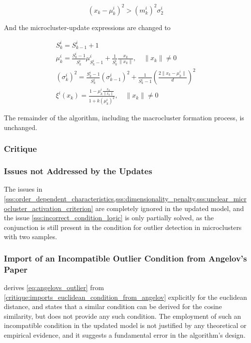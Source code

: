 \documentclass[a4paper]{article}
\begin{document}
\begin{equation}
    \left(x_k - \mu^i_k\right)^2 > \left(m^i_k\right)^2\sigma^i_2 \label{critique:imports_euclidean_condition_from_angelov}
\end{equation}

And the microcluster-update expressions are changed to

\begin{equation}
\begin{gathered}
    S^i_k = S^i_{k-1} + 1 \\
    \mu^i_k = \frac{S^i_k - 1}{S^i_k} \mu^i_{S^i_{k}-1} + \frac{1}{S^i_k} \frac{x_k}{\lVert x_k \rVert}, \quad \lVert x_k \rVert \neq 0 \\
    \left(\sigma^i_k\right)^2 = \frac{S^i_k - 1}{S^i_k} \left(\sigma^i_{k-1}\right)^2 + \frac{1}{S^i_k - 1} \left( \frac{2\lVert x_k - \mu^i_k \rVert}{d} \right)^2 \label{critique:euclidean_variance} \\
    \xi^i(x_k) = \frac{1 - \mu^i_k\frac{x_k}{\lVert x_k \rVert}}{1 + k\left(\mu^i_k\right)^2}, \quad \lVert x_k \rVert \neq 0
\end{gathered}
\end{equation}

The remainder of the algorithm, including the macrocluster formation process, is unchanged.

\subsubsection{Critique}

\subsubsection{Issues not Addressed by the Updates}

The issues in \cref{sss:order_dependent_characteristics,sss:dimensionality_penalty,sss:unclear_microcluster_activation_criterion} are completely ignored in the updated model, and the issue \ref{sss:incorrect_condition_logic} is only partially solved, as the conjunction is still present in the condition for outlier detection in microclusters with two samples.

\subsubsection{Import of an Incompatible Outlier Condition from Angelov's Paper}

\cite{angelov2014anomaly} derives \ref{eq:angelovs_outlier} from \ref{critique:imports_euclidean_condition_from_angelov} explicitly for the euclidean distance, and states that a similar condition can be derived for the cosine similarity, but does not provide any such condition. The employment of such an incompatible condition in the updated model is not justified by any theoretical or empirical evidence, and it suggests a fundamental error in the algorithm's design.
\end{document}

